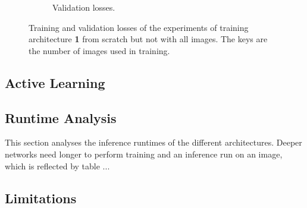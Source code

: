 \begin{figure}[!tbp]
\begin{subfigure}[t]{0.48\textwidth}
		\caption{Validation losses.}
	\end{subfigure}
	\caption{Training and validation losses of the experiments of training architecture \textbf{1} from scratch but not with all images. The keys are the number of images used in training.}
	\label{fig:experiments_online_sratch_loss}
\end{figure} 


\subsection{Active Learning} \label{subsection:experiments_active_learning}


\subsection{Runtime Analysis}

This section analyses the inference runtimes of the different architectures. Deeper networks need longer to perform training and an inference run on an image, which is reflected by table ...

\subsection{Limitations}






